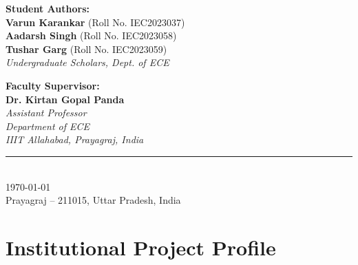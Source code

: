 \documentclass[11pt,a4paper,oneside]{report}
\begin{document}
\begin{titlepage}
\begin{minipage}{0.48\textwidth}
\begin{flushleft} \large
\textbf{\color{iiitablue}Student Authors:}\\[0.2cm]
\textbf{Varun Karankar} (Roll No. IEC2023037)\\
\textbf{Aadarsh Singh} (Roll No. IEC2023058)\\
\textbf{Tushar Garg} (Roll No. IEC2023059)\\[0.2cm]
\textit{Undergraduate Scholars, Dept. of ECE}
\end{flushleft}
\end{minipage}
\hfill
\begin{minipage}{0.48\textwidth}
\begin{flushright} \large
\textbf{\color{iiitablue}Faculty Supervisor:}\\[0.2cm]
\textbf{Dr. Kirtan Gopal Panda}\\[0.1cm]
\textit{Assistant Professor}\\
\textit{Department of ECE}\\
\textit{IIIT Allahabad, Prayagraj, India}
\end{flushright}
\end{minipage}

\vfill
\vspace{0.5cm}
{\color{gray}\rule{0.8\textwidth}{0.5pt}}\\[0.3cm]
{\large\today}\\[0.2cm]
{\small Prayagraj -- 211015, Uttar Pradesh, India}

\end{titlepage}

\setcounter{page}{2}

\chapter*{Institutional Project Profile}
\end{document}
